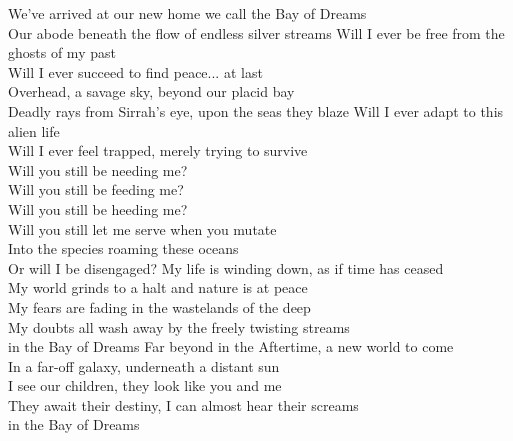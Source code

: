 We've arrived at our new home we call the Bay of Dreams\\
Our abode beneath the flow of endless silver streams
\hop
Will I ever be free from the ghosts of my past\tab{}\\
Will I ever succeed to find peace... at last\tab{}\\
\hop
Overhead, a savage sky, beyond our placid bay\tab{}\\
Deadly rays from Sirrah's eye, upon the seas they blaze
\hop
Will I ever adapt to this alien life\tab{}\\
Will I ever feel trapped, merely trying to survive\\
\hops
Will you still be needing me?\tab{}\\
Will you still be feeding me?\tab{}\\
Will you still be heeding me?\tab{}\\
Will you still let me serve when you mutate\\
Into the species roaming these oceans\\
Or will I be disengaged?\tab{}
\hops
My life is winding down, as if time has ceased\tab{}\\
My world grinds to a halt and nature is at peace\\
My fears are fading in the wastelands of the deep\\
My doubts all wash away by the freely twisting streams\\
in the Bay of Dreams \tab{}\tab{}
\hop
Far beyond in the Aftertime, a new world to come\\
In a far-off galaxy, underneath a distant sun\tab{}\\
I see our children, they look like you and me\tab{}\\
They await their destiny, I can almost hear their screams\\
in the Bay of Dreams \tab{}\tab{}

\clearpage
{}

